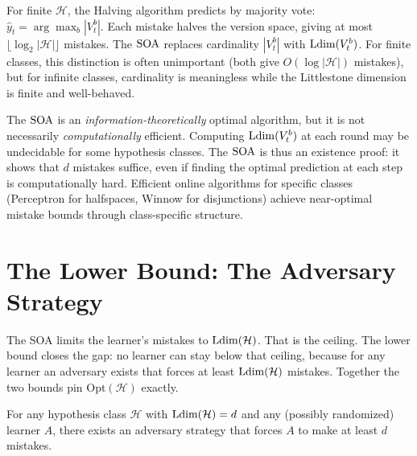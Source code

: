 \begin{remark}
\label{rmk:soa-halving}
For finite $\mathcal{H}$, the Halving algorithm predicts by majority vote: $\hat{y}_t = \arg\max_b |V_t^b|$. Each mistake halves the version space, giving at most $\lfloor \log_2 |\mathcal{H}| \rfloor$ mistakes. The $\mathrm{SOA}$ replaces cardinality $|V_t^b|$ with $\mathrm{Ldim}(V_t^b)$. For finite classes, this distinction is often unimportant (both give $O(\log |\mathcal{H}|)$ mistakes), but for infinite classes, cardinality is meaningless while the Littlestone dimension is finite and well-behaved.
\end{remark}

\begin{remark}
\label{rmk:soa-computability}
The $\mathrm{SOA}$ is an \emph{information-theoretically} optimal algorithm, but it is not necessarily \emph{computationally} efficient. Computing $\mathrm{Ldim}(V_t^b)$ at each round may be undecidable for some hypothesis classes. The $\mathrm{SOA}$ is thus an existence proof: it shows that $d$ mistakes suffice, even if finding the optimal prediction at each step is computationally hard. Efficient online algorithms for specific classes (Perceptron for halfspaces, Winnow for disjunctions) achieve near-optimal mistake bounds through class-specific structure.
\end{remark}


\section{The Lower Bound: The Adversary Strategy}
\label{sec:lower-bound}

The SOA limits the learner's mistakes to $\mathrm{Ldim}(\mathcal{H})$. That is the ceiling. The lower bound closes the gap: no learner can stay below that ceiling, because for any learner an adversary exists that forces at least $\mathrm{Ldim}(\mathcal{H})$ mistakes. Together the two bounds pin $\mathrm{Opt}(\mathcal{H})$ exactly.

\begin{thm}
\label{thm:lower-bound}
For any hypothesis class $\mathcal{H}$ with $\mathrm{Ldim}(\mathcal{H}) = d$ and any (possibly randomized) learner $A$, there exists an adversary strategy that forces $A$ to make at least $d$ mistakes.
\end{thm}

